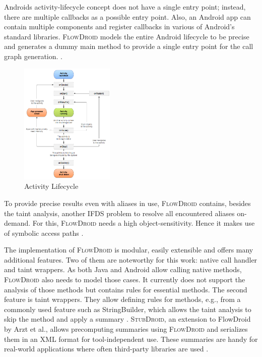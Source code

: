 \documentclass[../draft.tex]{subfiles}
\begin{document}
    Androids activity-lifecycle concept does not have a single entry point; instead, there are multiple callbacks as a possible entry point. Also, an Android app can contain multiple components and register callbacks in various of Android's standard libraries. \textsc{FlowDroid} models the entire Android lifecycle to be precise and generates a dummy main method to provide a single entry point for the call graph generation. \cite{Arzt2014}.

    \begin{figure}[ht]
        \centering
        \includegraphics[width=0.4\textwidth]{figs/activity_lifecycle.png}
        \caption{Activity Lifecycle\protect\footnotemark}
        \label{f:activity}
    \end{figure}

    To provide precise results even with aliases in use, \textsc{FlowDroid} contains, besides the taint analysis, another IFDS problem to resolve all encountered aliases on-demand. For this, \textsc{FlowDroid} needs a high object-sensitivity. Hence it makes use of symbolic access paths \cite{Arzt2014} .

    The implementation of \textsc{FlowDroid} is modular, easily extensible and offers many additional features. Two of them are noteworthy for this work: native call handler and taint wrappers. As both Java and Android allow calling native methods, \textsc{FlowDroid} also needs to model those cases. It currently does not support the analysis of those methods but contains rules for essential methods. The second feature is taint wrappers. They allow defining rules for methods, e.g., from a commonly used feature such as StringBuilder, which allows the taint analysis to skip the method and apply a summary \cite{Arzt2014}. \textsc{StubDroid}, an extension to FlowDroid by Arzt et al., allows precomputing summaries using \textsc{FlowDroid} and serializes them in an XML format for tool-independent use. These summaries are handy for real-world applications where often third-party libraries are used \cite{Arzt2017PhD}.
\end{document}
